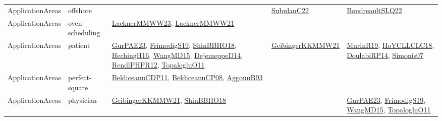 {\begin{longtable}{lp{3cm}>{\raggedright}p{6cm}>{\raggedright}p{6cm}p{8cm}}
ApplicationAreas & offshore &  & \href{articles/SubulanC22.pdf}{SubulanC22}\cite{SubulanC22} & \href{papers/BoudreaultSLQ22.pdf}{BoudreaultSLQ22}\cite{BoudreaultSLQ22}\\
ApplicationAreas & oven scheduling & \href{articles/LacknerMMWW23.pdf}{LacknerMMWW23}\cite{LacknerMMWW23}, \href{papers/LacknerMMWW21.pdf}{LacknerMMWW21}\cite{LacknerMMWW21} &  & \\
ApplicationAreas & patient & \href{articles/GurPAE23.pdf}{GurPAE23}\cite{GurPAE23}, \href{papers/FrimodigS19.pdf}{FrimodigS19}\cite{FrimodigS19}, \href{articles/ShinBBHO18.pdf}{ShinBBHO18}\cite{ShinBBHO18}, \href{papers/HechingH16.pdf}{HechingH16}\cite{HechingH16}, \href{articles/WangMD15.pdf}{WangMD15}\cite{WangMD15}, \href{papers/DejemeppeD14.pdf}{DejemeppeD14}\cite{DejemeppeD14}, \href{papers/RendlPHPR12.pdf}{RendlPHPR12}\cite{RendlPHPR12}, \href{articles/TopalogluO11.pdf}{TopalogluO11}\cite{TopalogluO11} & \href{papers/GeibingerKKMMW21.pdf}{GeibingerKKMMW21}\cite{GeibingerKKMMW21} & \href{papers/MurinR19.pdf}{MurinR19}\cite{MurinR19}, \href{papers/HoYCLLCLC18.pdf}{HoYCLLCLC18}\cite{HoYCLLCLC18}, \href{papers/DoulabiRP14.pdf}{DoulabiRP14}\cite{DoulabiRP14}, \href{articles/Simonis07.pdf}{Simonis07}\cite{Simonis07}\\
ApplicationAreas & perfect-square & \href{articles/BeldiceanuCDP11.pdf}{BeldiceanuCDP11}\cite{BeldiceanuCDP11}, \href{papers/BeldiceanuCP08.pdf}{BeldiceanuCP08}\cite{BeldiceanuCP08}, \href{articles/AggounB93.pdf}{AggounB93}\cite{AggounB93} &  & \\
ApplicationAreas & physician & \href{papers/GeibingerKKMMW21.pdf}{GeibingerKKMMW21}\cite{GeibingerKKMMW21}, \href{articles/ShinBBHO18.pdf}{ShinBBHO18}\cite{ShinBBHO18} &  & \href{articles/GurPAE23.pdf}{GurPAE23}\cite{GurPAE23}, \href{papers/FrimodigS19.pdf}{FrimodigS19}\cite{FrimodigS19}, \href{articles/WangMD15.pdf}{WangMD15}\cite{WangMD15}, \href{articles/TopalogluO11.pdf}{TopalogluO11}\cite{TopalogluO11}\\

\end{longtable}}
